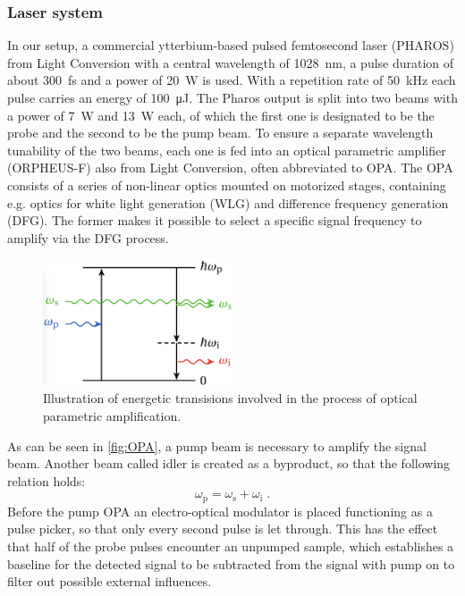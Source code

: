 \subsubsection*{Laser system}
In our setup, a commercial ytterbium-based pulsed femtosecond laser (PHAROS) from Light Conversion with a central wavelength of \qty{1028}{nm}, a pulse duration of about \qty{300}{fs} and a power of \qty{20}{W} is used.
With a repetition rate of \qty{50}{kHz} each pulse carries an energy of \qty{100}{\uJ}.
The Pharos output is split into two beams with a power of \qty{7}{W} and \qty{13}{W} each, of which the first one is designated to be the probe and the second to be the pump beam.
To ensure a separate wavelength tunability of the two beams, each one is fed into an optical parametric amplifier (ORPHEUS-F) also from Light Conversion, often abbreviated to OPA.
The OPA consists of a series of non-linear optics mounted on motorized stages, containing e.g. optics for white light generation (WLG) and difference frequency generation (DFG).
The former makes it possible to select a specific signal frequency to amplify via the DFG process.
\begin{figure}[ht]
    \centering
    \includegraphics[width=0.5\textwidth]{pictures/OPA.png}
    \caption{Illustration of energetic transisions involved in the process of optical parametric amplification.}
    \label{fig:OPA}
\end{figure}
As can be seen in \autoref{fig:OPA}, a pump beam is necessary to amplify the signal beam.
Another beam called idler is created as a byproduct, so that the following relation holds:
\begin{equation*}
    \omega_{\text{p}} = \omega_{\text{s}} + \omega_{\text{i}} \;.
\end{equation*}
Before the pump OPA an electro-optical modulator is placed functioning as a pulse picker, so that only every second pulse is let through.
This has the effect that half of the probe pulses encounter an unpumped sample, which establishes a baseline for the detected signal to be subtracted from the signal with pump on to filter out possible external influences.
